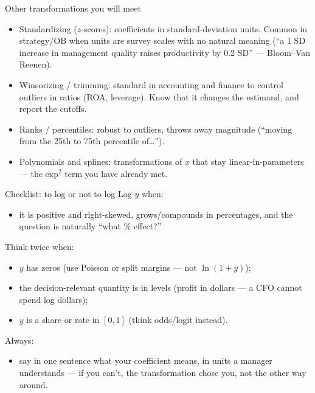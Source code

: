 \documentclass[aspectratio=169,11pt]{beamer}
\begin{document}
\begin{frame}{Other transformations you will meet}
\begin{itemize}
	\item \alert{Standardizing} ($z$-scores): coefficients in standard-deviation
	units. Common in strategy/OB when units are survey scales with no natural meaning
	(``a 1 SD increase in management quality raises productivity by 0.2 SD'' ---
	Bloom--Van Reenen).

	\medskip
	\item \alert{Winsorizing / trimming}: standard in accounting and finance to
	control outliers in ratios (ROA, leverage). Know that it changes the estimand,
	and report the cutoffs.

	\medskip
	\item \alert{Ranks / percentiles}: robust to outliers, throws away magnitude
	(``moving from the 25th to 75th percentile of\dots'').

	\medskip
	\item \alert{Polynomials and splines}: transformations of $x$ that stay
	linear-in-parameters --- the $\text{exp}^2$ term you have already met.
\end{itemize}
\end{frame}


\begin{frame}{Checklist: to log or not to log}
Log $y$ when:
\begin{itemize}
	\item it is positive and right-skewed, grows/compounds in percentages, and the
	question is naturally ``what \% effect?''
\end{itemize}
\medskip
Think twice when:
\begin{itemize}
	\item $y$ has \alert{zeros} (use Poisson or split margins --- not $\ln(1+y)$);
	\item the decision-relevant quantity is in \alert{levels} (profit in dollars ---
	a CFO cannot spend log dollars);
	\item $y$ is a \alert{share or rate} in $[0,1]$ (think odds/logit instead).
\end{itemize}
\medskip
Always:
\begin{itemize}
	\item say in one sentence what your coefficient means, in units a manager
	understands --- if you can't, the transformation chose you, not the other way
	around.
\end{itemize}
\end{frame}
\end{document}
